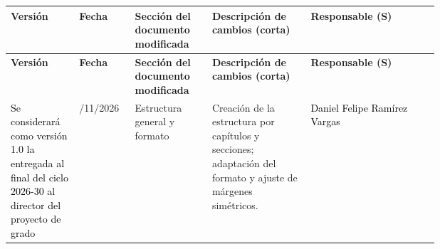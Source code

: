 
\begingroup
\let\centering\raggedright
\fuenteTabla\fontsize{9.3bp}{11bp}\selectfont
\setlength{\tabcolsep}{4bp}
  \sloppy
\renewcommand{\arraystretch}{1.2}

\begin{longtable}{|
>{\raggedright\arraybackslash}p{0.16\linewidth}|
>{\raggedright\arraybackslash}p{0.13\linewidth}|
>{\raggedright\arraybackslash}p{0.18\linewidth}|
>{\raggedright\arraybackslash}p{0.23\linewidth}|
>{\raggedright\arraybackslash}p{}|}
\hline
\textbf{Versión} &
\textbf{Fecha} &
\textbf{Sección del documento modificada} &
\centering\arraybackslash\textbf{Descripción de cambios (corta)} &
\textbf{Responsable (S)}\\
\hline
\endfirsthead

\hline
\textbf{Versión} &
\textbf{Fecha} &
\textbf{Sección del documento modificada} &
\centering\arraybackslash\textbf{Descripción de cambios (corta)} &
\textbf{Responsable (S)}\\
\hline
\endhead


\textcolor{black}{
Se considerará como versión 1.0 la entregada al final del ciclo 2026-30 al director del proyecto de grado
}
&
04/11/2026
&
Estructura general y formato
&
Creación de la estructura por capítulos y secciones; adaptación del formato y ajuste de márgenes simétricos.
&
\textcolor{black}{Daniel Felipe Ramírez Vargas}
\\\hline



\end{longtable}
